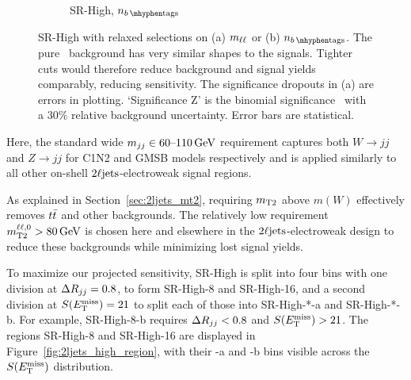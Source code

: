 \begin{figure}[tp]
\begin{subfigure}{0.48\textwidth}
\caption{SR-High, $\nbtag$}
\end{subfigure}
\caption[
SR-High with relaxed selections on (a) $\mll$ or (b) $\nbtag$
]{%
SR-High with relaxed selections on (a) $\mll$ or (b) $\nbtag$.
The pure \diboson\ background has very similar shapes to the signals.
Tighter cuts would therefore reduce background and signal yields comparably,
reducing sensitivity.
The significance dropouts in (a) are errors in plotting.
`Significance Z' is the binomial significance~\cite{cousins2008evaluation}
with a $30\%$ relative background uncertainty.
Error bars are statistical.
}
\label{fig:2ljets_high_mll_b}
\end{figure}

Here, the standard wide $\mjj \in 60\textrm{--}110\,\eV[G]$ requirement
captures both $W\to jj$ and $Z\to jj$ for C1N2 and GMSB models
respectively and is applied similarly to all other on-shell
$\twoljets$-electroweak signal regions.

As explained in Section~\ref{sec:2ljets_mt2}, requiring $\mttwo$ above $m(W)$
effectively removes $\ttbar$ and other backgrounds.
The relatively low requirement $\mttwoll > 80\,\eV[G]$ is chosen here and
elsewhere in the $\twoljets$-electroweak design to reduce these backgrounds
while minimizing lost signal yields.

To maximize our projected sensitivity, SR-High is split into four bins with
one division at $\rjj = 0.8$, to form SR-High-8 and SR-High-16, and a second
division at $\metsig = 21$ to split each of those into
SR-High-*-a and SR-High-*-b.
For example, SR-High-8-b requires $\rjj < 0.8$ and $\metsig > 21$.
The regions SR-High-8 and SR-High-16 are displayed in
Figure~\ref{fig:2ljets_high_region}, with their -a and -b bins visible across
the $\metsig$ distribution.

